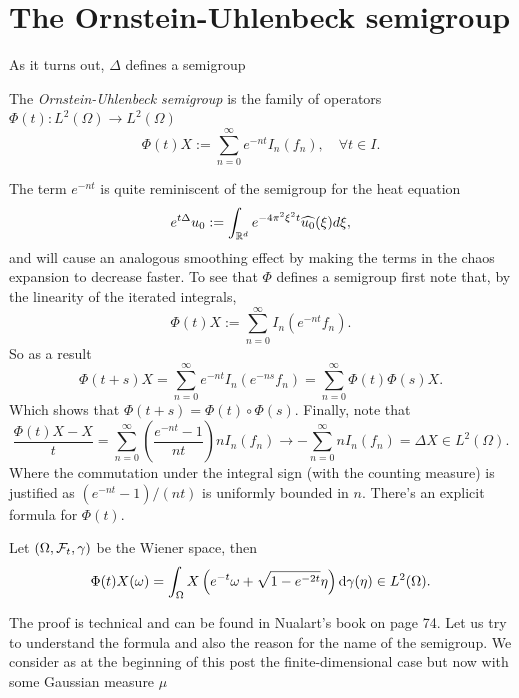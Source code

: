 \documentclass[
    a4paper,
    DIV=14,
    abstract=true,
    numbers=noenddot
]{scrartcl}
\begin{document}
	\section{The Ornstein-Uhlenbeck semigroup}
	As it turns out, $\Delta $ defines a semigroup
	\begin{definition}
		The \emph{Ornstein-Uhlenbeck semigroup} is the family of operators $\Phi(t):L^2(\Omega)\to L^2(\Omega)$
		\begin{equation*}
			\Phi(t)X:=\sum_{n=0}^{\infty}  e^{-nt}I_n(f_n),  \quad\forall t\in I.
		\end{equation*}

	\end{definition}
	The term $e^{-nt}$ is quite reminiscent of the semigroup for the heat equation
	\begin{equation*}
		e^{t\Delta }u_0:=\int_{\mathbb{R}^d}e^{-4 \pi^2 \xi^2t}\widehat{u_0}(\xi ) d\xi,
	\end{equation*}
	and will cause an analogous smoothing effect by making the terms in the chaos expansion to decrease	faster. To see that  $\Phi$ defines a semigroup first note that, by the linearity of the iterated integrals,
	\begin{equation*}
		\Phi(t)X:=\sum_{n=0}^{\infty}  I_n(e^{-nt}f_n).
	\end{equation*}
	So as a result
	\begin{equation*}
		\Phi(t+s)X=\sum_{n=0}^{\infty}  e^{-nt}I_n(e^{-ns}f_n)=\sum_{n=0}^{\infty}  \Phi(t)\Phi(s)X.
	\end{equation*}
	Which shows that $\Phi(t+s)=\Phi(t)\circ \Phi(s)$. Finally, note that
	\begin{equation*}
		\frac{\Phi(t)X-X}{t}=\sum_{n=0}^{\infty} \left(\frac{e^{-nt}-1}{nt} \right)nI_n(f_n)\to -\sum_{n=0}^{\infty}  nI_n(f_n)=\Delta X \in L^2(\Omega)  .
	\end{equation*}
	Where the commutation under the integral sign (with the counting measure) is justified as $(e^{-nt}-1)/(nt)$ is uniformly bounded in $n$.
	There's an explicit formula for $\Phi(t)$.
	\begin{proposition}
		Let $(\Omega,\mathcal{F}_t,\gamma  )$ be the Wiener space, then
		\begin{equation*}
			\Phi(t)X(\omega)=\int_{\Omega}X\left(e^{-t}\omega+\sqrt{1-e^{-2t}}\eta\right) \mathrm{d} \gamma  (\eta)\in L^2(\Omega).
		\end{equation*}
	\end{proposition}
	The  proof is technical and can be found in  Nualart's book \cite{nualart2018introduction} on  page 74. Let us try to understand the formula and also the reason for the name of the semigroup. We consider as at the beginning of this post the finite-dimensional case but now with some Gaussian measure $\mu $
\end{document}
